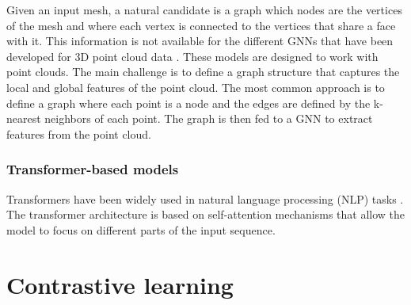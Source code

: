 Given an input mesh, a natural candidate is a graph which nodes are the vertices of the mesh and where each vertex is connected to the vertices that share a face with it. This information is not available for the different GNNs that have been developed for 3D point cloud data \cite{vermaFeaStNetFeatureSteeredGraph2018,wangDynamicGraphCNN2019,dengPPFNetGlobalContext2018}. These models are designed to work with point clouds. The main challenge is to define a graph structure that captures the local and global features of the point cloud. The most common approach is to define a graph where each point is a node and the edges are defined by the k-nearest neighbors of each point. The graph is then fed to a GNN to extract features from the point cloud.

\subsubsection{Transformer-based models}

Transformers have been widely used in natural language processing (NLP) tasks \cite{vaswaniAttentionAllYou2023b}. The transformer architecture is based on self-attention mechanisms that allow the model to focus on different parts of the input sequence. 

\section{Contrastive learning}


